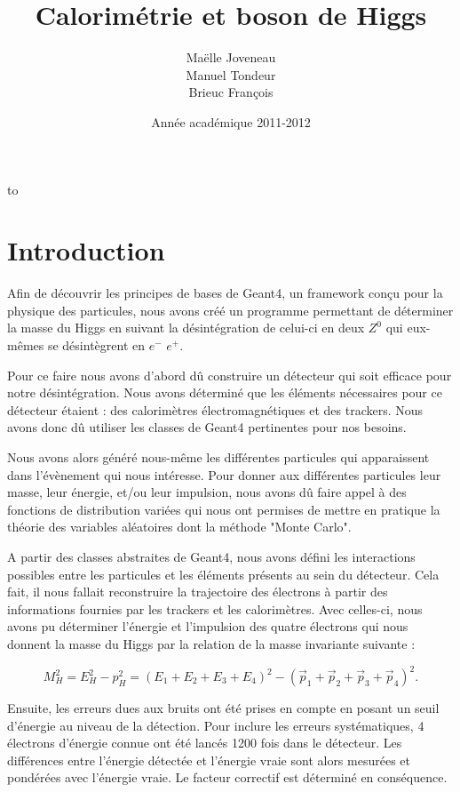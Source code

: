 \documentclass[11pt]{article}
\title{Calorimétrie et boson de Higgs}
\author{ Maëlle Joveneau \\ Manuel Tondeur \\ Brieuc François }
\date{Année académique 2011-2012}
\makeatletter
\def\clap#1{\hbox to 0pt{\hss #1\hss}}%
\def\haut#1#2#3{%
\hbox to \hsize{%
\rlap{\vtop{\raggedright #1}}%
\hss
\clap{\vtop{\centering #2}}%
\hss
\llap{\vtop{\raggedleft #3}}}}%
\def\bas#1#2#3{%
\hbox to \hsize{%
\rlap{\vbox{\raggedright #1}}%
\hss
\clap{\vbox{\centering #2}}%
\hss
\llap{\vbox{\raggedleft #3}}}}%
\def\maketitle{%
\thispagestyle{empty}\vbox to \vsize{%
\haut{}{\@blurb}{}
\vfill
\vspace{1cm}
\begin{flushleft}
\usefont{OT1}{ptm}{m}{n}
\huge \@title
\end{flushleft}
\par
\hrule height 4pt
\par
\begin{flushright}
\usefont{OT1}{phv}{m}{n}
\Large \@author
\par
\end{flushright}
\vspace{1cm}
\vfill
\vfill
\bas{}{\@location, \@date}{}
}%
\cleardoublepage
}
\makeatother
\begin{document}
	\maketitle
		
	\tableofcontents

	\newpage
	
			\section{Introduction}
	Afin de d\'ecouvrir les principes de bases de Geant4, un framework conçu
pour la physique des particules, nous avons cr\'eé un programme permettant de
d\'eterminer la masse du Higgs en suivant la d\'esint\'egration de celui-ci en
deux $Z^0$ qui eux-m\^emes se d\'esint\`egrent en $e^-$ $e^+$.

Pour ce faire nous avons d'abord dû construire un d\'etecteur qui soit efficace
pour notre d\'esint\'egration. Nous avons d\'etermin\'e que les \'el\'ements
n\'ecessaires pour ce d\'etecteur \'etaient : des calorim\`etres
\'electromagn\'etiques et des trackers. Nous avons donc dû utiliser les classes
de Geant4 pertinentes pour nos besoins.
 
Nous avons alors g\'en\'er\'e nous-m\^eme les diff\'erentes particules qui
apparaissent dans l'\'ev\`enement qui nous int\'eresse. Pour donner aux
diff\'erentes particules leur masse, leur \'energie, et/ou leur impulsion, nous
avons dû faire appel \`a des fonctions de distribution vari\'ees qui nous ont
permises de mettre en pratique la th\'eorie des variables aléatoires dont la
méthode "Monte Carlo".
 
A partir des classes abstraites de Geant4, nous avons défini les interactions
possibles entre les particules et les \'el\'ements pr\'esents au sein du
d\'etecteur. Cela fait, il nous fallait reconstruire la trajectoire des
\'electrons \`a partir des informations fournies par les trackers et les
calorim\`etres. Avec celles-ci, nous avons pu d\'eterminer l'\'energie et
l'impulsion des quatre \'electrons qui nous donnent la masse du Higgs par la
relation de la masse invariante suivante : 
 
\begin{equation}
M_H^2=E_H^2-p_H^2=(E_1+E_2+E_3+E_4)^2-(\vec{p}_1+\vec{p}_2+\vec{p}_3+\vec{p}_4)^2.
\end{equation} 
    
Ensuite, les erreurs dues aux bruits ont \'et\'e prises en compte en posant un seuil d'\'energie au niveau de la 
d\'etection. Pour inclure les erreurs syst\'ematiques, 4 électrons d'énergie connue ont été lancés 1200 fois dans 
le détecteur. Les diff\'erences entre l'énergie détectée et l'énergie vraie sont alors mesurées et pondérées avec 
l'énergie vraie. Le facteur correctif est déterminé en conséquence.
\end{document}
